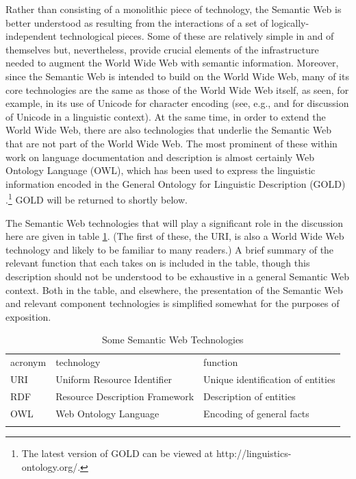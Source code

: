 \documentclass[12pt]{article}
\makeatletter
\newcommand{\tref}[1]{table \ref{#1}}
\newcommand\namecite{\citet}
\renewcommand\cite{\citep}
\def\Hline{\noalign{\hrule \@height \arrayruleHwidth}}
\makeatother
\begin{document}
Rather than consisting of a monolithic piece of technology, the Semantic Web is
better understood as resulting from the interactions of a set of
logically-independent technological pieces. Some of these are relatively simple
in and of themselves but, nevertheless, provide crucial elements of the
infrastructure needed to augment the World Wide Web with semantic information.
Moreover, since the Semantic Web is intended to build on the World Wide Web,
many of its core technologies are the same as those of the World Wide Web
itself, as seen, for example, in its use of Unicode for character encoding (see,
e.g., \namecite{Anderson:EMELD:2003} and \namecite[345--351]{Gippert:2006} for
discussion of Unicode in a linguistic context). At the same time, in order to
extend the World Wide Web, there are also technologies that underlie the
Semantic Web that are not part of the World Wide Web. The most prominent of
these within work on language documentation and description is almost certainly
Web Ontology Language (OWL), which has been used to express the linguistic
information encoded in the General Ontology for Linguistic Description (GOLD)
\cite{FarrarLangendoen:2003,FarrarLewis:2007,FarrarLangendoen:2009}.{\footnote{The
latest version of GOLD can be viewed at http://linguistics-ontology.org/.}}
GOLD will be returned to shortly below.

The Semantic Web technologies that will play a significant role in the
discussion here are given in \tref{SWTech}. (The first of these, the URI, is
also a World Wide Web technology and likely to be familiar to many readers.) A
brief summary of the relevant function that each takes on is included in the
table, though this description should not be understood to be exhaustive in a
general Semantic Web context. Both in the table, and elsewhere, the presentation
of the Semantic Web and relevant component technologies is simplified somewhat
for the purposes of exposition.

\begin{table}[ht]
\centering
\begin{tabular}{@{}lll@{}}
\Hline
{\sc acronym}	&	{\sc technology}				&	{\sc function}		\\
\Hline
URI				&	Uniform Resource Identifier		&	Unique identification of entities	\\
RDF				&	Resource Description Framework	&	Description of entities				\\
OWL				&	Web Ontology Language 			&	Encoding of general facts 			\\
\Hline
\end{tabular}
\caption{Some Semantic Web Technologies \label{SWTech}} 
\end{table}
\end{document}
